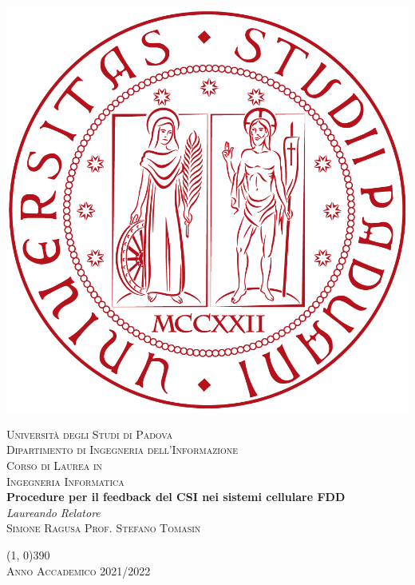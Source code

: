 



\frontmatter

\begin{titlepage}
    \begin{center}
        \includegraphics[scale=0.1]{images/unipd-red.png}

        \vspace{0.8cm}
        \textsc{\LARGE Università degli Studi di Padova}\\
        \vspace{0.45cm}
        \textsc{\large Dipartimento di Ingegneria dell'Informazione}\\
        \vspace{0.4cm}
        \textsc{\large Corso di Laurea in}\\
        \textsc{\large Ingegneria Informatica}\\

        \vfill
        {\LARGE \bfseries Procedure per il feedback del CSI nei sistemi cellulare FDD}\\

        \vfill
        \textit{\large Laureando}
        \hfill
        \textit{\large Relatore}\\
        \textsc{\large Simone Ragusa}
        \hfill
        \textsc{\large Prof. Stefano Tomasin}\\

        \vspace{0.4cm}

        \vfill
        \line(1, 0){390}\\
        \textsc{Anno Accademico 2021/2022}
    \end{center}
\end{titlepage}

